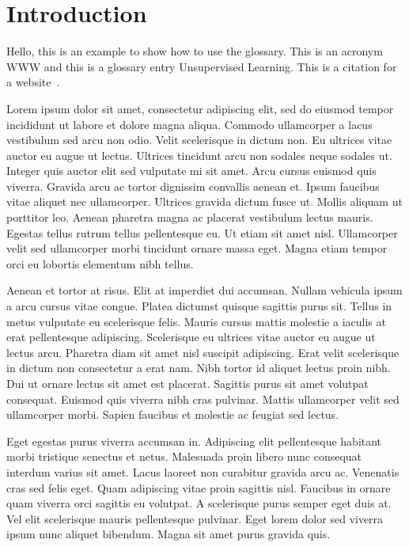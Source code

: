 \chapter{Introduction}

Hello, this is an example to show how to use the glossary. This is an acronym \gls{WWW} and this is a
glossary entry \gls{Unsupervised Learning}. This is a citation for a website~\cite{website:this_repo}.


Lorem ipsum dolor sit amet, consectetur adipiscing elit, sed do eiusmod tempor incididunt ut labore et dolore magna aliqua. Commodo ullamcorper a lacus vestibulum sed arcu non odio. Velit scelerisque in dictum non. Eu ultrices vitae auctor eu augue ut lectus. Ultrices tincidunt arcu non sodales neque sodales ut. Integer quis auctor elit sed vulputate mi sit amet. Arcu cursus euismod quis viverra. Gravida arcu ac tortor dignissim convallis aenean et. Ipsum faucibus vitae aliquet nec ullamcorper. Ultrices gravida dictum fusce ut. Mollis aliquam ut porttitor leo. Aenean pharetra magna ac placerat vestibulum lectus mauris. Egestas tellus rutrum tellus pellentesque eu. Ut etiam sit amet nisl. Ullamcorper velit sed ullamcorper morbi tincidunt ornare massa eget. Magna etiam tempor orci eu lobortis elementum nibh tellus.

Aenean et tortor at risus. Elit at imperdiet dui accumsan. Nullam vehicula ipsum a arcu cursus vitae congue. Platea dictumst quisque sagittis purus sit. Tellus in metus vulputate eu scelerisque felis. Mauris cursus mattis molestie a iaculis at erat pellentesque adipiscing. Scelerisque eu ultrices vitae auctor eu augue ut lectus arcu. Pharetra diam sit amet nisl suscipit adipiscing. Erat velit scelerisque in dictum non consectetur a erat nam. Nibh tortor id aliquet lectus proin nibh. Dui ut ornare lectus sit amet est placerat. Sagittis purus sit amet volutpat consequat. Euismod quis viverra nibh cras pulvinar. Mattis ullamcorper velit sed ullamcorper morbi. Sapien faucibus et molestie ac feugiat sed lectus.

Eget egestas purus viverra accumsan in. Adipiscing elit pellentesque habitant morbi tristique senectus et netus. Malesuada proin libero nunc consequat interdum varius sit amet. Lacus laoreet non curabitur gravida arcu ac. Venenatis cras sed felis eget. Quam adipiscing vitae proin sagittis nisl. Faucibus in ornare quam viverra orci sagittis eu volutpat. A scelerisque purus semper eget duis at. Vel elit scelerisque mauris pellentesque pulvinar. Eget lorem dolor sed viverra ipsum nunc aliquet bibendum. Magna sit amet purus gravida quis.

